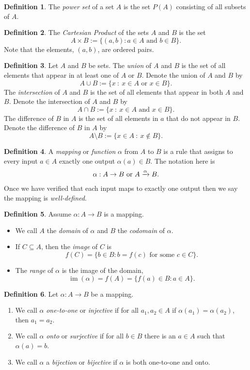 \documentclass[12pt]{article}
\newcommand{\enumalph}[1]{
\begin{enumerate}[label=(\alph*)]
	#1
\end{enumerate}
}
\theoremstyle{definition}
\newtheorem*{defn}{Definition}
\newcommand{\im}{\operatorname{im}}
\begin{document}
\begin{defn}
	The \emph{power set} of a set $A$ is the set $P(A)$ consisting of all subsets of $A$.
\end{defn}
\begin{defn}
The \emph{Cartesian Product} of the sets $A$ and $B$ is the set
\[A\times B:=\{(a,b):a\in A\text{ and }b\in B\}.\]
Note that the elements, $(a,b)$, are ordered pairs.
\end{defn}
\begin{defn}
	Let $A$ and $B$ be sets.
	The \emph{union} of $A$ and $B$ is the set of all elements that appear in at least one of $A$ or $B$.  Denote the union of $A$ and $B$ by 
		\[A\cup B:= \{x\ :\ x\in A\text{ or }x\in B\}.\]
	The \emph{intersection} of $A$ and $B$ is the set of all elements that appear in both $A$ and $B$. Denote the intersection of $A$ and $B$ by 
		\[A\cap B:= \{x\ :\ x\in A\text{ and }x\in B\}.\]
	The difference of $B$ in $A$ is the set of all elements in $a$ that do not appear in $B$. Denote the difference of $B$ in $A$ by
		\[A\setminus B:=\{x\in A\ :\ x\not\in B\}.\]
\end{defn}
\begin{defn}
A \emph{mapping} or \emph{function} $\alpha$ from $A$ to $B$ is a rule that assigns to every input $a\in A$ exactly one output $\alpha(a)\in B$.  The notation here is
\[\alpha:A\to B\textup{ or }A\xrightarrow{\alpha}B.\]

Once we have verified that each input maps to exactly one output then we say the mapping is \emph{well-defined}.
\end{defn}
\begin{defn} Assume $\alpha:A \to B$ is a mapping.
\begin{itemize}[label=--]
	\item We call $A$ the \emph{domain} of $\alpha$ and $B$ the \emph{codomain} of $\alpha$.
	\item If $C\subseteq A$, then the \emph{image} of $C$ is \[f(C)=\{b\in B : b=f(c)\text{ for some } c\in C\}.\] 
	\item The \emph{range} of $\alpha$ is the image of the domain, \[\im(\alpha)=f(A)=\{f(a)\in B : a\in A\}.\]
\end{itemize}
\end{defn}
\begin{defn}
Let $\alpha:A\to B$ be a mapping.
\enumalph{
	\item We call $\alpha$ \emph{one-to-one} or \emph{injective} if for all $a_1,a_2\in A$ if $\alpha(a_1)=\alpha(a_2)$, then $a_1=a_2$.
	\item We call $\alpha$ \emph{onto} or \emph{surjective} if for all $b\in B$ there is an $a\in A$ such that $\alpha(a)=b$.
	\item We call $\alpha$ a \emph{bijection} or \emph{bijective} if $\alpha$ is both one-to-one and onto.
}
\end{defn}
\end{document}
